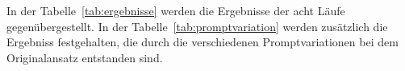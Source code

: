 In der Tabelle~\ref{tab:ergebnisse} werden die Ergebnisse der acht Läufe gegenübergestellt. In der Tabelle~\ref{tab:promptvariation} werden zusätzlich die 
Ergebniss festgehalten, die durch die verschiedenen Promptvariationen bei dem Originalansatz entstanden sind.

\begin{table}[htbp]
\centering

\label{tab:ergebnisse}
\end{table}

\begin{table}[htbp]
\centering
\caption{Recall und \ac{fpr} der Promptvariation}
\label{tab:promptvariation}

\end{table}

